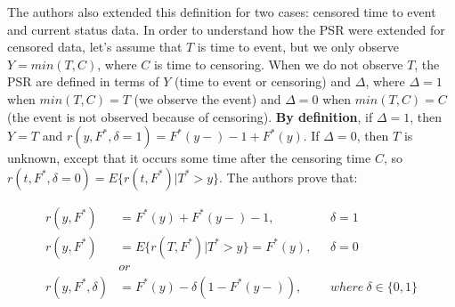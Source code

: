 \documentclass[]{article}
\begin{document}
The authors also extended this definition for two cases: censored time to event and current status data. In order to understand how the PSR were extended for censored data, let's assume that $T$ is time to event, but we only observe $Y = min(T, C)$, where $C$ is time to censoring. When we do not observe $T$, the PSR are defined in terms of $Y$ (time to event or censoring) and $\Delta$, where $\Delta = 1$ when $min(T, C)=T$ (we observe the event) and $\Delta =0$ when $min(T, C)=C$ (the event is not observed because of censoring). \textbf{By definition}, if $\Delta = 1$, then $Y=T$ and $r(y,F^*, \delta=1) = F^*(y-) - 1 + F^*(y)$. If $\Delta = 0$, then $T$ is unknown, except that it occurs some time after the censoring time $C$, so $r(t,F^*, \delta=0) = E\{r(t,F^*)|T^*>y\}$. The authors prove that:
%

	$$
	\begin{aligned}
		r(y, F^*) &= F^*(y) + F^*(y-) - 1,~~~&\delta = 1 \\
		r(y, F^*) &= E\{r(T,F^*)|T^*>y\} = F^*(y) ,~~~&\delta = 0 \\
		&or\\
    r(y, F^*, \delta) &= F^*(y) - \delta(1 - F^*(y-)),~~~&where~\delta \in \{0,1\}
	\end{aligned}
	$$
\end{document}
